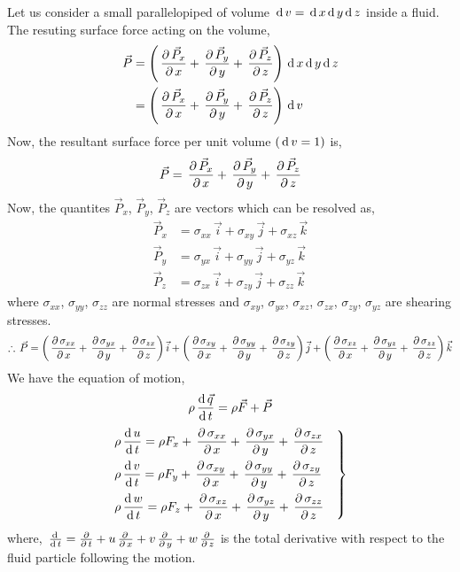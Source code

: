 \documentclass[../main-sheet.tex]{subfiles}
\begin{document}
\begin{soln}
    Let us consider a small parallelopiped of volume \(\,\mathrm{d}\, v=\,\mathrm{d}\, x\,\mathrm{d}\, y\,\mathrm{d}\, z\) inside a fluid. The resuting surface force acting on the volume,
    \begin{align*}
        \vec{P}&=\left( \,\frac{\partial\, \vec{P}_x}{\partial\, x}+\,\frac{\partial\, \vec{P}_y}{\partial\, y}+\,\frac{\partial\, \vec{P}_z}{\partial\, z} \right)\,\mathrm{d}\, x\,\mathrm{d}\, y\,\mathrm{d}\, z\\
        &=\left( \,\frac{\partial\, \vec{P}_x}{\partial\, x}+\,\frac{\partial\, \vec{P}_y}{\partial\, y}+\,\frac{\partial\, \vec{P}_z}{\partial\, z} \right)\,\mathrm{d}\, v
    \end{align*}
    Now, the resultant surface force per unit volume \((\,\mathrm{d}\, v=1)\) is,
    \[
        \vec{P}=\,\frac{\partial\, \vec{P}_x}{\partial\, x}+\,\frac{\partial\, \vec{P}_y}{\partial\, y}+\,\frac{\partial\, \vec{P}_z}{\partial\, z}
    \]
    Now, the quantites \(\vec{P}_x\), \(\vec{P}_y\), \(\vec{P}_z\) are vectors which can be resolved as,
    \begin{align*}
        \vec{P}_x&=\sigma_{xx}\,\vec{i}+\sigma_{xy}\,\vec{j}+\sigma_{xz}\,\vec{k}\\
        \vec{P}_y&=\sigma_{yx}\,\vec{i}+\sigma_{yy}\,\vec{j}+\sigma_{yz}\,\vec{k}\\
        \vec{P}_z&=\sigma_{zx}\,\vec{i}+\sigma_{zy}\,\vec{j}+\sigma_{zz}\,\vec{k}
    \end{align*}
    where \(\sigma_{xx}\), \(\sigma_{yy}\), \(\sigma_{zz}\) are normal stresses and \(\sigma_{xy}\), \(\sigma_{yx}\), \(\sigma_{xz}\), \(\sigma_{zx}\), \(\sigma_{zy}\), \(\sigma_{yz}\) are shearing stresses.
    \[
        \therefore \,\vec{P}=
        \left( \,\frac{\partial\, \sigma_{xx}}{\partial\, x}+\,\frac{\partial\, \sigma_{yx}}{\partial\, y}+\,\frac{\partial\, \sigma_{zx}}{\partial\, z} \right)\vec{i}+
        \left( \,\frac{\partial\, \sigma_{xy}}{\partial\, x}+\,\frac{\partial\, \sigma_{yy}}{\partial\, y}+\,\frac{\partial\, \sigma_{zy}}{\partial\, z} \right)\vec{j}+
        \left( \,\frac{\partial\, \sigma_{xz}}{\partial\, x}+\,\frac{\partial\, \sigma_{yz}}{\partial\, y}+\,\frac{\partial\, \sigma_{zz}}{\partial\, z} \right)\vec{k}
    \]
    We have the equation of motion,
    \[\rho\,\frac{\mathrm{d}\,\vec{q}}{\mathrm{d}\,t}=\rho\vec{F}+\vec{P}\]
\begin{equation}
    \begin{rcases}
        \displaystyle\rho\,\frac{\mathrm{d}\,u}{\mathrm{d}\,t}=\rho F_x+\,\frac{\partial\, \sigma_{xx}}{\partial\, x}+\,\frac{\partial\, \sigma_{yx}}{\partial\, y}+\,\frac{\partial\, \sigma_{zx}}{\partial\, z}\\
        \displaystyle\rho\,\frac{\mathrm{d}\,v}{\mathrm{d}\,t}=\rho F_y+\,\frac{\partial\, \sigma_{xy}}{\partial\, x}+\,\frac{\partial\, \sigma_{yy}}{\partial\, y}+\,\frac{\partial\, \sigma_{zy}}{\partial\, z}\\
        \displaystyle\rho\,\frac{\mathrm{d}\,w}{\mathrm{d}\,t}=\rho F_z+\,\frac{\partial\, \sigma_{xz}}{\partial\, x}+\,\frac{\partial\, \sigma_{yz}}{\partial\, y}+\,\frac{\partial\, \sigma_{zz}}{\partial\, z}\quad
    \end{rcases}\label{eq:navier1}
\end{equation}
where, \(\,\frac{\mathrm{d}\,}{\mathrm{d}\,t}=\frac{\partial}{\partial\,t}+u\,\frac{\partial\, }{\partial\, x}+v\,\frac{\partial\, }{\partial\, y}+w\,\frac{\partial\, }{\partial\, z}\) is the total derivative with respect to the fluid particle following the motion.\\



\end{soln}
\end{document}
